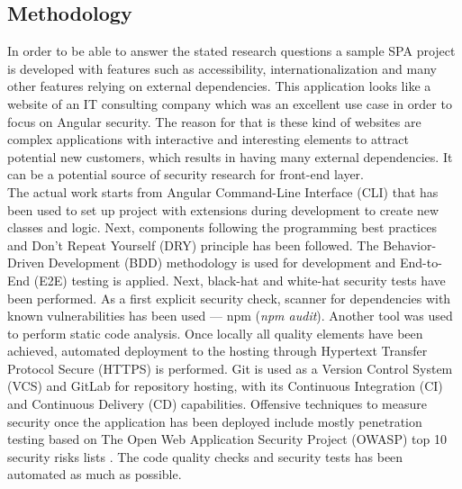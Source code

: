 \documentclass{article} %
\begin{document}
\subsection{Methodology}
In order to be able to answer the stated research questions a sample SPA project is developed with features such as accessibility, internationalization and many other features relying on external dependencies. This application looks like a website of an IT consulting company which was an excellent use case in order to focus on Angular security. The reason for that is these kind of websites are complex applications with interactive and interesting elements to attract potential new customers, which results in having many external dependencies. It can be a potential source of security research for front-end layer.\\
\newline
The actual work starts from Angular Command-Line Interface (CLI) that has been used to set up project with extensions during development to create new classes and logic. Next, components following the programming best practices and Don't Repeat Yourself (DRY) principle has been followed. The Behavior-Driven Development (BDD) methodology is used for development and End-to-End (E2E) testing is applied. Next, black-hat and white-hat security tests have been performed. As a first explicit security check, scanner for dependencies with known vulnerabilities has been used --- npm (\textit{npm audit}). Another tool was used to perform static code analysis. Once locally all quality elements have been achieved, automated deployment to the hosting through Hypertext Transfer Protocol Secure (HTTPS) is performed. Git is used as a Version Control System (VCS) and GitLab for repository hosting, with its Continuous Integration (CI) and Continuous Delivery (CD) capabilities. Offensive techniques to measure security once the application has been deployed include mostly penetration testing based on The Open Web Application Security Project (OWASP) top 10 security risks lists \cite{bib:owasp_2013, bib:owasp_2017}. The code quality checks and security tests has been automated as much as possible.
\end{document}
